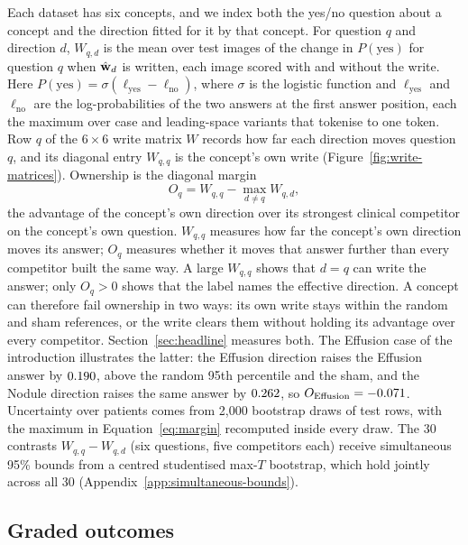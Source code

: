\documentclass{article}
\begin{document}
Each dataset has six concepts, and we index both the yes/no question about a concept and the direction fitted for it by that concept. For question $q$ and direction $d$, $W_{q,d}$ is the mean over test images of the change in $P(\mathrm{yes})$ for question $q$ when $\hat{\mathbf{w}}_d$ is written, each image scored with and without the write. Here $P(\mathrm{yes})=\sigma(\ell_{\mathrm{yes}}-\ell_{\mathrm{no}})$, where $\sigma$ is the logistic function and $\ell_{\mathrm{yes}}$ and $\ell_{\mathrm{no}}$ are the log-probabilities of the two answers at the first answer position, each the maximum over case and leading-space variants that tokenise to one token. Row $q$ of the $6\times6$ write matrix $W$ records how far each direction moves question $q$, and its diagonal entry $W_{q,q}$ is the concept's own write (Figure~\ref{fig:write-matrices}). Ownership is the diagonal margin
\begin{equation}
O_q=W_{q,q}-\max_{d\neq q}W_{q,d},
\label{eq:margin}
\end{equation}
the advantage of the concept's own direction over its strongest clinical competitor on the concept's own question. $W_{q,q}$ measures how far the concept's own direction moves its answer; $O_q$ measures whether it moves that answer further than every competitor built the same way. A large $W_{q,q}$ shows that $d=q$ can write the answer; only $O_q>0$ shows that the label names the effective direction. A concept can therefore fail ownership in two ways: its own write stays within the random and sham references, or the write clears them without holding its advantage over every competitor. Section~\ref{sec:headline} measures both. The Effusion case of the introduction illustrates the latter: the Effusion direction raises the Effusion answer by $0.190$, above the random 95th percentile and the sham, and the Nodule direction raises the same answer by $0.262$, so $O_{\mathrm{Effusion}}=-0.071$. Uncertainty over patients comes from 2{,}000 bootstrap draws of test rows, with the maximum in Equation~\ref{eq:margin} recomputed inside every draw. The 30 contrasts $W_{q,q}-W_{q,d}$ (six questions, five competitors each) receive simultaneous 95\% bounds from a centred studentised max-$T$ bootstrap, which hold jointly across all 30 (Appendix~\ref{app:simultaneous-bounds}).

\subsection{Graded outcomes}
\label{sec:grades}
\end{document}
